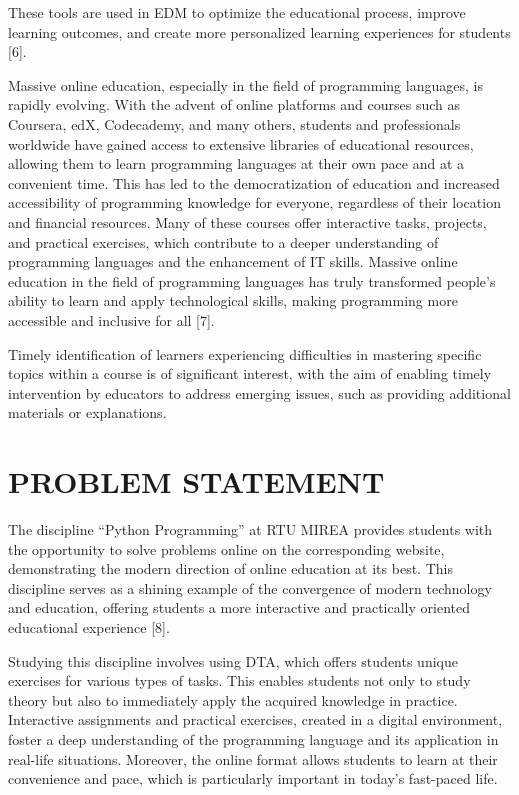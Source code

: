 \documentclass[letterpaper]{article}
\begin{document}
\begin{multicols}{2}
\begin{justify}
      These tools are used in EDM to optimize the educational process, improve learning outcomes, and create more personalized learning experiences for students [6].

      Massive online education, especially in the field of programming languages, is rapidly evolving. With the advent of online platforms and courses such as Coursera, edX, Codecademy, and many others, students and professionals worldwide have gained access to extensive libraries of educational resources, allowing them to learn programming languages at their own pace and at a convenient time. This has led to the democratization of education and increased accessibility of programming knowledge for everyone, regardless of their location and financial resources. Many of these courses offer interactive tasks, projects, and practical exercises, which contribute to a deeper understanding of programming languages and the enhancement of IT skills. Massive online education in the field of programming languages has truly transformed people's ability to learn and apply technological skills, making programming more accessible and inclusive for all [7].

      Timely identification of learners experiencing difficulties in mastering specific topics within a course is of significant interest, with the aim of enabling timely intervention by educators to address emerging issues, such as providing additional materials or explanations.
      
      \section{PROBLEM STATEMENT}
      The discipline “Python Programming” at RTU MIREA provides students with the opportunity to solve problems online on the corresponding website, demonstrating the modern direction of online education at its best. This discipline serves as a shining example of the convergence of modern technology and education, offering students a more interactive and practically oriented educational experience [8].

      Studying this discipline involves using DTA, which offers students unique exercises for various types of tasks. This enables students not only to study theory but also to immediately apply the acquired knowledge in practice. Interactive assignments and practical exercises, created in a digital environment, foster a deep understanding of the programming language and its application in real-life situations. Moreover, the online format allows students to learn at their convenience and pace, which is particularly important in today's fast-paced life.


\end{justify}
\end{multicols}
\end{document}
